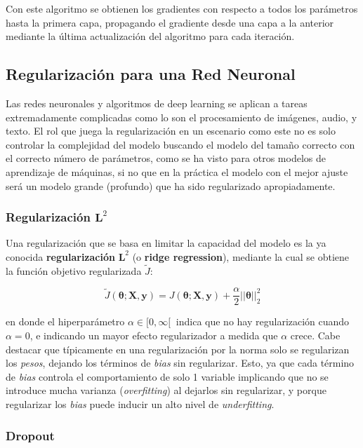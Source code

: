 Con este algoritmo se obtienen los gradientes con respecto a todos los par\'ametros hasta la primera capa, propagando el gradiente desde una capa a la anterior mediante la \'ultima actualizaci\'on del algoritmo para cada iteraci\'on.

\subsection{Regularizaci\'on para una Red Neuronal}

Las redes neuronales y algoritmos de deep learning se aplican a tareas extremadamente complicadas como lo son el procesamiento de im\'agenes, audio, y texto. El rol que juega la regularizaci\'on en un escenario como este no es solo controlar la complejidad del modelo buscando el modelo del tama{\~{n}}o  correcto con el correcto n\'umero de par\'ametros, como se ha visto para otros modelos de aprendizaje de m\'aquinas, si no que en la pr\'actica el modelo con el mejor ajuste ser\'a un modelo grande (profundo) que ha sido regularizado apropiadamente.

\subsubsection{Regularizaci\'on $\bm{L}^{2}$}

Una regularizaci\'on que se basa en limitar la capacidad del modelo es la ya conocida \textbf{regularizaci\'on} $\bm{L}^{2}$ (o \textbf{ridge regression}), mediante la cual se obtiene la funci\'on objetivo regularizada $\tilde{J}$:

\begin{equation}
\tilde{J}(\bm{\theta};\bm{X},\bm{y}) = J(\bm{\theta};\bm{X},\bm{y}) + \frac{\alpha}{2}||\bm{\theta}||^{2}_{2}
\end{equation}

en donde el hiperpar\'ametro $\alpha \in [0,\infty[\ $ indica que no hay regularizaci\'on cuando $\alpha = 0$, e indicando un mayor efecto regularizador a medida que $\alpha$ crece. Cabe destacar que t\'ipicamente en una regularizaci\'on por la norma solo se regularizan los \textit{pesos}, dejando los t\'erminos de \textit{bias} sin regularizar. Esto, ya que cada t\'ermino de \textit{bias} controla el comportamiento de solo 1 variable implicando que no se introduce mucha varianza (\textit{overfitting}) al dejarlos sin regularizar, y porque regularizar los \textit{bias} puede inducir un alto nivel de \textit{underfitting}.

\subsubsection{Dropout}

